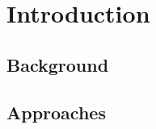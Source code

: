 

\chapter{Introduction}
\label{chapterIntroduction}
\ifpdf
    \graphicspath{{Intro/fig/PNG/}{Intro/figDF/}{Intro/fig/}}
\else
    \graphicspath{{Intro/fig/EPS/}{Intro/fig/}}
\fi






\section{Background} 

\section{Approaches} 

